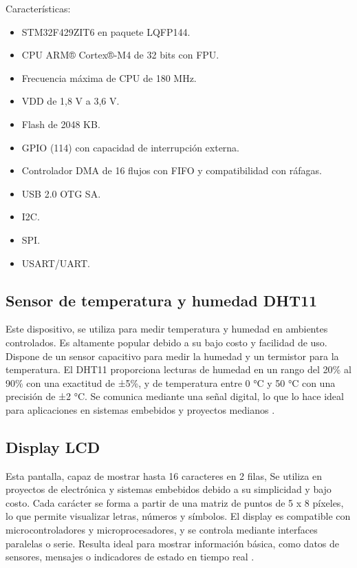 Características:
\begin{itemize}
\item STM32F429ZIT6 en paquete LQFP144.
\item CPU ARM® Cortex®-M4 de 32 bits con FPU.
\item Frecuencia máxima de CPU de 180 MHz.
\item VDD de 1,8 V a 3,6 V.
\item Flash de 2048 KB.
\item GPIO (114) con capacidad de interrupción externa.
\item Controlador DMA de 16 flujos con FIFO y compatibilidad con ráfagas.
\item USB 2.0 OTG SA.
\item I2C.
\item SPI.
\item USART/UART.
\end{itemize}

\subsection{Sensor de temperatura y humedad DHT11}
\label{subsec:dht11}

Este dispositivo, se utiliza para medir temperatura y humedad en ambientes controlados. Es altamente popular debido a su bajo costo y facilidad de uso. Dispone de un sensor capacitivo para medir la humedad y un termistor para la temperatura. El DHT11 proporciona lecturas de humedad en un rango del 20\% al 90\% con una exactitud de ±5\%, y de temperatura entre 0 °C y 50 °C con una precisión de ±2 °C. Se comunica mediante una señal digital, lo que lo hace ideal para aplicaciones en sistemas embebidos y proyectos medianos \citep{WEBSITE:Dht112024}.

\subsection{Display LCD}
\label{subsec:DisplayLCD}

Esta pantalla, capaz de mostrar hasta 16 caracteres en 2 filas, Se utiliza en proyectos de electrónica y sistemas embebidos debido a su simplicidad y bajo costo. Cada carácter se forma a partir de una matriz de puntos de 5 x 8 píxeles, lo que permite visualizar letras, números y símbolos. El display es compatible con microcontroladores y microprocesadores, y se controla mediante interfaces paralelas o serie. Resulta ideal para mostrar información básica, como datos de sensores, mensajes o indicadores de estado en tiempo real \citep{WEBSITE:lcd2024}.

